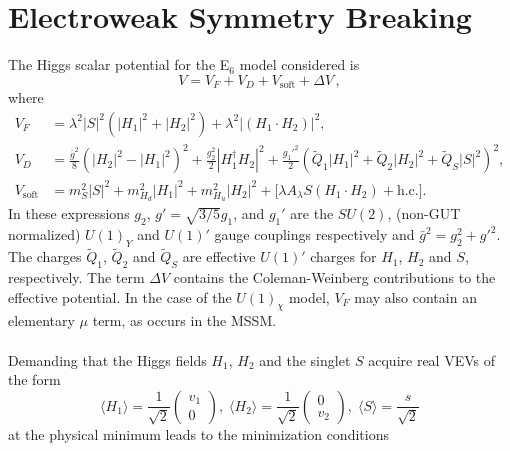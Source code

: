 \documentclass[preprint,amsmath,amssymb,aps,superscriptaddress,prd,showpacs,floatfix,nofootinbib]{revtex4-1}
\begin{document}
 



\section{\label{sec:ewsb}Electroweak Symmetry Breaking}
The Higgs scalar potential for the E$_6$ model considered is \cite{King:2005jy} 
\begin{equation}\label{eq:E6VeffOneLoop}
V=V_F+V_D+V_{\textrm{soft}}+\Delta V \, ,
\end{equation}
where
\begin{align}
V_F&=\lambda^2|S|^2(|H_1|^2+|H_2|^2)+\lambda^2|(H_1\cdot
H_2)|^2,\label{eq:E6VFterms}\\ V_D&=\frac{\bar{g}^2}{8}\left (
|H_2|^2-|H_1|^2\right )^2+\frac{g_2^2}{2}|H_1^\dagger
H_2|^2+\frac{g_1'^2}{2}(\tilde{Q}_1|H_1|^2+\tilde{Q}_2|H_2|^2+\tilde{Q}_S|S|^2)^2,\label{eq:E6VDterms}\\ V_{\textrm{soft}}&=m_S^2|S|^2+m_{H_d}^2|H_1|^2+m_{H_u}^2|H_2|^2+\Big
[\lambda A_\lambda S(H_1\cdot H_2)+\textrm{h.c.}\Big
].\label{eq:E6Vsoft}
\end{align}
In these expressions $g_2$, $g'=\sqrt{3/5}g_1$, and $g_1'$ are the
$SU(2)$, (non-GUT normalized) $U(1)_Y$ and $U(1)'$ gauge couplings
respectively and $\bar{g}^2=g_2^2+g'^2$. The charges $\tilde{Q}_1$,
$\tilde{Q}_2$ and $\tilde{Q}_S$ are effective $U(1)'$ charges for
$H_1$, $H_2$ and $S$, respectively. The term $\Delta V$ contains the
Coleman-Weinberg contributions to the effective potential. In the case
of the $U(1)_\chi$ model, $V_F$ may also contain an elementary
$\mu$ term, as occurs in the MSSM.\\ \\ Demanding that
the Higgs fields $H_1$, $H_2$ and the singlet $S$ acquire real VEVs of
the form
\begin{equation}\label{eq:E6vevs}
\langle H_1 \rangle = \frac{1}{\sqrt{2}}\begin{pmatrix} v_1 \\ 0\end{pmatrix}, \; \langle H_2 \rangle = \frac{1}{\sqrt{2}}\begin{pmatrix} 0 \\ v_2 \end{pmatrix}, \; \langle S \rangle =\frac{s}{\sqrt{2}}
\end{equation}
at the physical minimum leads to the minimization conditions
\end{document}
